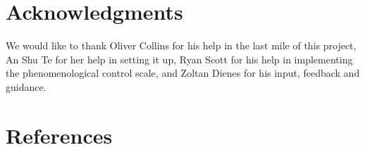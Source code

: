 \documentclass[
  man,
  floatsintext,
  longtable,
  nolmodern,
  notxfonts,
  notimes,
  colorlinks=true,linkcolor=blue,citecolor=blue,urlcolor=blue]{apa7}
\begin{document}
\section{Acknowledgments}\label{acknowledgments}

We would like to thank Oliver Collins for his help in the last mile of
this project, An Shu Te for her help in setting it up, Ryan Scott for
his help in implementing the phenomenological control scale, and Zoltan
Dienes for his input, feedback and guidance.

\pagebreak

\section{References}\label{references}

\label{refs}
\end{document}

